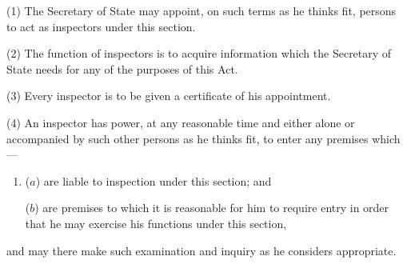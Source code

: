 \documentclass[12pt,a4paper]{article}
\begin{document}
%
%
%
%
%

(1) The 
Secretary of State 
may appoint, on such terms as 
he 
thinks fit, persons to act as inspectors under this section.

(2) The function of inspectors is to acquire information which the 
Secretary of State 
needs for any of the purposes of this Act.

(3) Every inspector is to be given a certificate of his appointment.

(4) An inspector has power, at any reasonable time and either alone or accompanied by such other persons as he thinks fit, to enter any premises which—
\begin{enumerate}\item[]
($a$) are liable to inspection under this section; and

($b$) are premises to which it is reasonable for him to require entry in order that he may exercise his functions under this section,
\end{enumerate}
and may there make such examination and inquiry as he considers appropriate.
\end{document}
